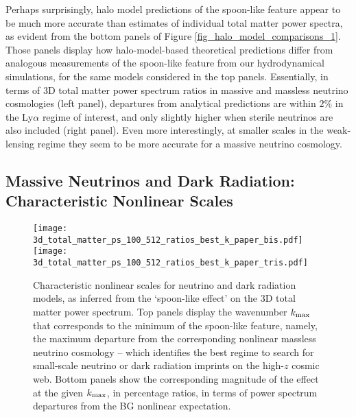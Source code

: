 \documentclass{emulateapj}
\begin{document}
Perhaps surprisingly, halo model predictions of the spoon-like feature appear to be
much more accurate than estimates of individual total matter power spectra, as 
evident from the bottom panels of Figure \ref{fig_halo_model_comparisons_1}.
Those panels display how halo-model-based theoretical predictions differ
from analogous measurements of the spoon-like feature from our hydrodynamical 
simulations, for the same models considered in the top panels. 
Essentially, in terms of 3D total matter power spectrum ratios in massive and massless neutrino cosmologies (left panel),
departures from analytical predictions are within $2 \%$ in the Ly$\alpha$
regime of interest, and only slightly higher when sterile neutrinos are also included (right panel). 
Even more interestingly, at smaller scales in the weak-lensing regime they seem to be more accurate
for a massive neutrino cosmology. 
 

\subsection{Massive Neutrinos and Dark Radiation: Characteristic Nonlinear Scales} \label{sub_nu_nonlinear_scales}

\begin{figure}
\texttt{[image: 3d\_total\_matter\_ps\_100\_512\_ratios\_best\_k\_paper\_bis.pdf]}
\texttt{[image: 3d\_total\_matter\_ps\_100\_512\_ratios\_best\_k\_paper\_tris.pdf]}
\caption{Characteristic nonlinear scales for neutrino and dark radiation models, as inferred from the `spoon-like effect' on the 3D total matter power spectrum. 
Top panels display the wavenumber $k_{\rm max}$ that corresponds to the minimum of the spoon-like feature, namely, the maximum departure from the
corresponding nonlinear massless neutrino cosmology -- which identifies  the best regime to search for small-scale neutrino or dark radiation imprints on the high-$z$ cosmic web. 
 Bottom panels show the corresponding magnitude of the effect at the given $k_{\rm max}$, in percentage ratios, in terms of power spectrum departures from the BG nonlinear expectation.}
\label{fig_nu_bao_like_scale}
\end{figure}

\end{document}
